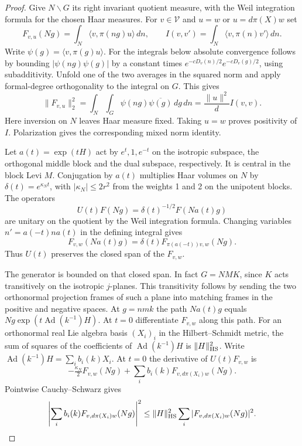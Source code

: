 \begin{proof}
Give \(N\backslash G\) its right invariant quotient measure, with
the Weil integration formula for the chosen Haar measures. For
\(v\in\mathcal V\) and \(u=w\) or \(u=d\pi(X)w\) set
\[
  F_{v,u}(Ng)=\int_N\langle v,\pi(ng)u\rangle\,dn,\qquad
  I(v,v')=\int_N\langle v,\pi(n)v'\rangle\,dn .
\]
Write \(\psi(g)=\langle v,\pi(g)u\rangle\). For the integrals
below absolute convergence follows by bounding
\(|\psi(ng)\psi(g)|\) by a constant times
\(e^{-cD_v(n)/2}e^{-cD_v(g)/2}\), using subadditivity.
Unfold one of the two averages in the squared norm and apply
formal-degree orthogonality to the integral on \(G\). This gives
\[
   \|F_{v,u}\|_2^2
   =\int_N\int_G\psi(ng)\overline{\psi(g)}\,dg\,dn
   =\frac{\|u\|^2}{d} I(v,v).
\]
Here inversion on \(N\) leaves Haar measure fixed.
Taking \(u=w\) proves positivity of \(I\). Polarization gives
the corresponding mixed norm identity.

Let \(a(t)=\exp(tH)\) act by \(e^t,1,e^{-t}\) on the
isotropic subspace, the orthogonal middle block and the dual
subspace, respectively. It is central in the block Levi \(M\).
Conjugation by \(a(t)\) multiplies Haar volumes on \(N\) by
\(\delta(t)=e^{\kappa_N t}\), with
\(|\kappa_N|\le2r^2\) from the weights 1 and 2 on the
unipotent blocks. The operators
\[
   U(t)F(Ng)=\delta(t)^{-1/2}F(Na(t)g)
\]
are unitary on the quotient by the Weil integration formula.
Changing variables \(n'=a(-t)na(t)\) in the defining integral gives
\[
  F_{v,w}(Na(t)g)=\delta(t)F_{\pi(a(-t))v,w}(Ng).
\]
Thus \(U(t)\) preserves the closed span of the \(F_{v,w}\).

The generator is bounded on that closed span. In fact
\(G=NMK\), since \(K\) acts transitively on the isotropic
\(j\)-planes. This transitivity follows by sending the two
orthonormal projection frames of such a plane into matching
frames in the positive and negative spaces. At \(g=nmk\)
the path \(Na(t)g\) equals \(Ng\exp(t\operatorname{Ad}(k^{-1})H)\).
At \(t=0\) differentiate \(F_{v,w}\) along this path. For an
orthonormal real Lie algebra basis \((X_i)_i\) in the
Hilbert--Schmidt metric, the sum of squares of the coefficients
of \(\operatorname{Ad}(k^{-1})H\) is \(\|H\|_{\rm HS}^2\).
Write \(\operatorname{Ad}(k^{-1})H=\sum_i b_i(k)X_i\).
At \(t=0\) the derivative of \(U(t)F_{v,w}\) is
\[
 -\tfrac{\kappa_N}{2}F_{v,w}(Ng)
         +\sum_i b_i(k)F_{v,d\pi(X_i)w}(Ng).
\]
Pointwise Cauchy--Schwarz gives
\[
 \left|\sum_i b_i(k)F_{v,d\pi(X_i)w}(Ng)\right|^2
        \le \|H\|_{\rm HS}^2\sum_i |F_{v,d\pi(X_i)w}(Ng)|^2 .
\]


\end{proof}
